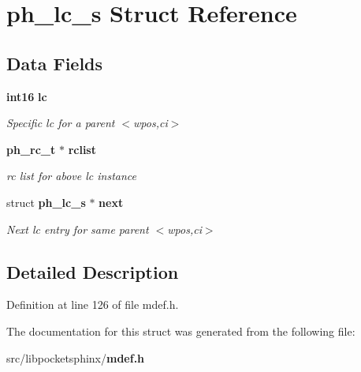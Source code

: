 \section{ph\-\_\-lc\-\_\-s \-Struct \-Reference}
\label{structph__lc__s}
\subsection*{\-Data \-Fields}
\begin{DoxyCompactItemize}
\item 
{\bf int16} {\bf lc}\label{structph__lc__s_adfb4e9553a4e2314543f9f1ef661185e}

\begin{DoxyCompactList}\small\item\em \-Specific lc for a parent $<$wpos,ci$>$ \end{DoxyCompactList}\item 
{\bf ph\-\_\-rc\-\_\-t} $\ast$ {\bf rclist}\label{structph__lc__s_aac24b848d70d96894c312d16050c4051}

\begin{DoxyCompactList}\small\item\em rc list for above lc instance \end{DoxyCompactList}\item 
struct {\bf ph\-\_\-lc\-\_\-s} $\ast$ {\bf next}\label{structph__lc__s_a5cda7044037678163c2242dde19df13a}

\begin{DoxyCompactList}\small\item\em \-Next lc entry for same parent $<$wpos,ci$>$ \end{DoxyCompactList}\end{DoxyCompactItemize}


\subsection{\-Detailed \-Description}


\-Definition at line 126 of file mdef.\-h.



\-The documentation for this struct was generated from the following file\-:\begin{DoxyCompactItemize}
\item 
src/libpocketsphinx/{\bf mdef.\-h}\end{DoxyCompactItemize}
